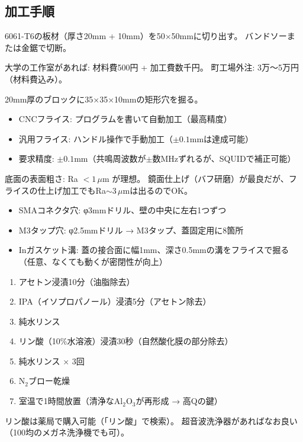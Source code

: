 \documentclass[12pt,a4paper]{article}
\begin{document}
\subsection{加工手順}

\begin{practicebox}
6061-T6の板材（厚さ20mm + 10mm）を50×50mmに切り出す。
バンドソーまたは金鋸で切断。

大学の工作室があれば: 材料費500円 + 加工費数千円。
町工場外注: 3万〜5万円（材料費込み）。
\end{practicebox}

\begin{practicebox}
20mm厚のブロックに35×35×10mmの矩形穴を掘る。
\begin{itemize}
\item CNCフライス: プログラムを書いて自動加工（最高精度）
\item 汎用フライス: ハンドル操作で手動加工（$\pm 0.1$mmは達成可能）
\item 要求精度: $\pm 0.1$mm（共鳴周波数が$\pm$数MHzずれるが、SQUIDで補正可能）
\end{itemize}
底面の表面粗さ: Ra $< 1\,\mu$m が理想。
鏡面仕上げ（バフ研磨）が最良だが、フライスの仕上げ加工でもRa$\sim 3\,\mu$mは出るのでOK。
\end{practicebox}

\begin{practicebox}
\begin{itemize}
\item SMAコネクタ穴: φ3mmドリル、壁の中央に左右1つずつ
\item M3タップ穴: φ2.5mmドリル → M3タップ、蓋固定用に8箇所
\item Inガスケット溝: 蓋の接合面に幅1mm、深さ0.5mmの溝をフライスで掘る（任意、なくても動くが密閉性が向上）
\end{itemize}
\end{practicebox}

\begin{practicebox}
\begin{enumerate}
\item アセトン浸漬10分（油脂除去）
\item IPA（イソプロパノール）浸漬5分（アセトン除去）
\item 純水リンス
\item リン酸（10\%水溶液）浸漬30秒（自然酸化膜の部分除去）
\item 純水リンス × 3回
\item N$_2$ブロー乾燥
\item 室温で1時間放置（清浄なAl$_2$O$_3$が再形成 → 高Qの鍵）
\end{enumerate}

リン酸は薬局で購入可能（「リン酸」で検索）。
超音波洗浄器があればなお良い（100均のメガネ洗浄機でも可）。
\end{practicebox}
\end{document}
